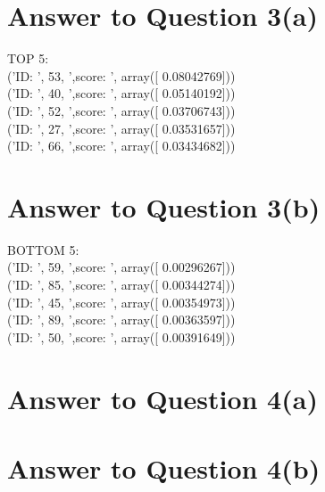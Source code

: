 \documentclass[11pt]{article}
\begin{document}
\section*{Answer to Question 3(a)}
TOP 5:\\
('ID: ', 53, ',score: ', array([ 0.08042769]))\\
('ID: ', 40, ',score: ', array([ 0.05140192]))\\
('ID: ', 52, ',score: ', array([ 0.03706743]))\\
('ID: ', 27, ',score: ', array([ 0.03531657]))\\
('ID: ', 66, ',score: ', array([ 0.03434682]))\\

\section*{Answer to Question 3(b)}
BOTTOM 5: \\
('ID: ', 59, ',score: ', array([ 0.00296267]))\\
('ID: ', 85, ',score: ', array([ 0.00344274]))\\
('ID: ', 45, ',score: ', array([ 0.00354973]))\\
('ID: ', 89, ',score: ', array([ 0.00363597]))\\
('ID: ', 50, ',score: ', array([ 0.00391649]))\\



\section*{Answer to Question 4(a)}

\section*{Answer to Question 4(b)}
\end{document}
